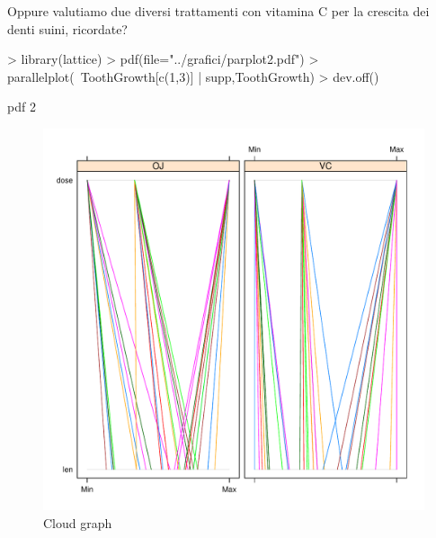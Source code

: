 \documentclass[onecolumn,11pt]{book}
\begin{document}
Oppure valutiamo due diversi trattamenti con vitamina C per la crescita dei denti suini,
ricordate?

\begin{Schunk}
\begin{Sinput}
> library(lattice)
> pdf(file="../grafici/parplot2.pdf")
> parallelplot(~ToothGrowth[c(1,3)] | supp,ToothGrowth)
> dev.off()
\end{Sinput}
\begin{Soutput}
pdf 
  2 
\end{Soutput}
\end{Schunk}
\begin{figure}[htbp]
\begin{center}
\includegraphics[scale=0.6]{../grafici/parplot2.pdf}
\caption{Cloud graph}
\label{default}
\end{center}
\end{figure} 
\end{document}
